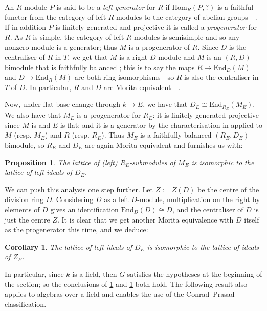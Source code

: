 \documentclass[11pt,reqno]{amsart}
\newtheorem{cor}[lemma]{Corollary}
\newtheorem{prop}[lemma]{Proposition}
\theoremstyle{definition}
\theoremstyle{remark}
\theoremstyle{definition}
\theoremstyle{plain}
\newcommand{\Hom}{\mathrm{Hom}}
\newcommand{\End}{\mathrm{End}}
\begin{document}
An $R$-module $P$ is said to be a \emph{left generator} for $R$ if $\Hom_R(P,?)$ is a faithful functor from the category of left $R$-modules to the category of abelian groups---\!\!\cite[18.7]{Lam2}. If in addition $P$ is finitely generated and projective it is called a \emph{progenerator} for $R$. 
As $R$ is simple, the category of left $R$-modules is semisimple and so any nonzero module is a generator; 
thus $M$ is a progenerator of $R$. Since $D$ is the centraliser of $R$ in $T$, we get that $M$ is a right $D$-module and $M$ is an $(R,D)$-bimodule that is faithfully balanced \cite[18.21]{Lam2}; this is to say the maps $R\to \End_D(M)$ and $D\to \End_R(M)$ are both ring isomorphisms---so $R$ is also the centraliser in $T$ of $D$. In particular, $R$ and $D$ are Morita equivalent---\!\!\cite[18.33]{Lam2}.

Now, under flat base change through $k\to E$,  we have  that $D_E\cong \End_{R_E}(M_E)$.
We also have that $M_E$ is a progenerator for $R_E$: it is finitely-generated projective since $M$ is and $E$ is flat; and it is a generator
by the characterisation in \cite[18.8(3)]{Lam2} applied to $M$ (resp. $M_E$) and $R$ (resp. $R_E$). 
Thus $M_E$ is a faithfully balanced $(R_E,D_E)$-bimodule, so  $R_E$ and $D_E$ are again Morita equivalent and
 \cite[18.44]{Lam2} furnishes us with:
\begin{prop}\label{prop:REDE}
The  lattice of (left) $R_E$-submodules of $M_E$ is isomorphic to the lattice of left ideals of $D_E$.
\end{prop}

We can push this analysis one step further.
Let $Z :=Z(D)$ be the centre of the division ring $D$.
Considering $D$ as a left $D$-module, multiplication on the right by elements of $D$ gives an identification $\End_D(D) \cong D$, 
and the centraliser of $D$ is just the centre $Z$.
It is clear that we get another Morita equivalence with $D$ itself as the progenerator this time, and we deduce:
\begin{cor}\label{cor:DEZE}
The  lattice of left ideals of $D_E$ is isomorphic to the lattice of ideals of $Z_E$.
\end{cor}

\begin{center}\end{center}

In particular, since $k$ is a field, then $G$ satisfies the hypotheses at the beginning of the section; so the conclusions of \cref{prop:REDE} and \cref{cor:DEZE} both hold. The following result  also applies to algebras over a field and enables the use of the Conrad--Prasad classification.
\end{document}
